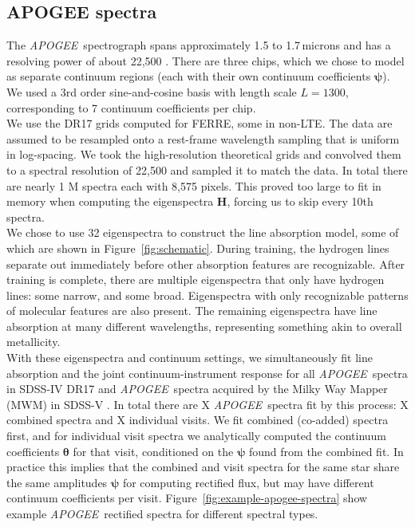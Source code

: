 \documentclass[modern]{aastex631}
\newcommand{\project}[1]{\textit{#1}}
\newcommand{\vectheta}{\boldsymbol{\theta}}
\newcommand{\vecpsi}{\boldsymbol{\psi}}
\newcommand{\vecH}{\mathbf{H}}
\newcommand{\apogee}{\project{APOGEE}}
\newcommand{\todo}[1]{\textcolor{tab:blue}{#1}}
\begin{document}



\subsection{APOGEE spectra}
\label{sec:apogee}

The \apogee\ spectrograph spans approximately 1.5 to 1.7\,microns and has a resolving power of about 22,500 \citep{wilson}. There are three chips, which we chose to model as separate continuum regions (each with their own continuum coefficients $\vecpsi$). We used a 3rd order sine-and-cosine basis with length scale $L = 1300$, corresponding to 7 continuum coefficients per chip.\\

We use the \todo{DR17 grids computed for FERRE, some in non-LTE}. The data are assumed to be resampled onto a rest-frame wavelength sampling that is uniform in log-spacing. We took the high-resolution theoretical grids and convolved them to a spectral resolution of 22,500 and sampled it to match the data. In total there are nearly \todo{1 M} spectra each with 8,575 pixels. This proved too large to fit in memory when computing the eigenspectra $\vecH$, forcing us to skip every 10th spectra.\\

We chose to use 32 eigenspectra to construct the line absorption model, some of which are shown in Figure~\ref{fig:schematic}. During training, the hydrogen lines separate out immediately before other absorption features are recognizable. After training is complete, there are multiple eigenspectra that only have hydrogen lines: some narrow, and some broad. Eigenspectra with only recognizable patterns of molecular features are also present. The remaining eigenspectra have line absorption at many different wavelengths, representing something akin to overall metallicity. \\

With these eigenspectra and continuum settings, we simultaneously fit line absorption and the joint continuum-instrument response for all \apogee\ spectra in SDSS-IV DR17 \citep{dr17} and \apogee\ spectra acquired by the Milky Way Mapper (MWM) in SDSS-V \citep{kollmeier}. In total there are \todo{X} \apogee\ spectra fit by this process: \todo{X} combined spectra and \todo{X} individual visits. We fit combined (co-added) spectra first, and for individual visit spectra we analytically computed the continuum coefficients $\vectheta$ for that visit, conditioned on the $\vecpsi$ found from the combined fit. In practice this implies that the combined and visit spectra for the same star share the same amplitudes $\vecpsi$ for computing rectified flux, but may have different continuum coefficients per visit. Figure~\ref{fig:example-apogee-spectra} show example \apogee\ rectified spectra for different spectral types. 
\end{document}
